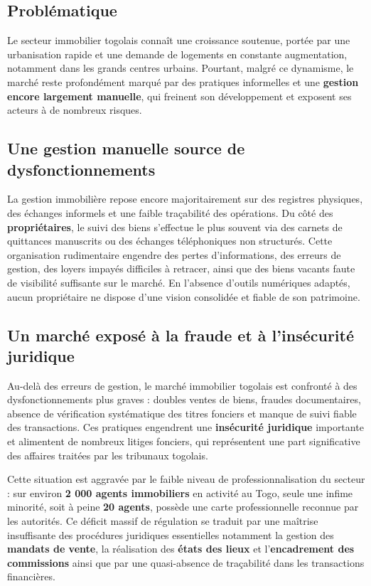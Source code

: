 \documentclass[12pt,a4paper]{report}
\newcommand{\motcle}[1]{\textcolor{marine}{\textbf{#1}}}
\newcommand{\important}[1]{\textcolor{cuivre}{\textbf{#1}}}
\begin{document}
\subsection{Problématique}

\begin{highlightbox}

Le secteur immobilier togolais connaît une croissance soutenue, portée par une urbanisation rapide et une demande de logements en constante augmentation, notamment dans les grands centres urbains. Pourtant, malgré ce dynamisme, le marché reste profondément marqué par des pratiques informelles et une \motcle{gestion encore largement manuelle}, qui freinent son développement et exposent ses acteurs à de nombreux risques.

\subsection{Une gestion manuelle source de dysfonctionnements}

La gestion immobilière repose encore majoritairement sur des registres physiques, des échanges informels et une faible traçabilité des opérations. Du côté des \motcle{propriétaires}, le suivi des biens s'effectue le plus souvent via des carnets de quittances manuscrits ou des échanges téléphoniques non structurés. Cette organisation rudimentaire engendre des pertes d'informations, des erreurs de gestion, des loyers impayés difficiles à retracer, ainsi que des biens vacants faute de visibilité suffisante sur le marché. En l'absence d'outils numériques adaptés, aucun propriétaire ne dispose d'une vision consolidée et fiable de son patrimoine.

\subsection{Un marché exposé à la fraude et à l'insécurité juridique}

Au-delà des erreurs de gestion, le marché immobilier togolais est confronté à des dysfonctionnements plus graves : doubles ventes de biens, fraudes documentaires, absence de vérification systématique des titres fonciers et manque de suivi fiable des transactions. Ces pratiques engendrent une \important{insécurité juridique} importante et alimentent de nombreux litiges fonciers, qui représentent une part significative des affaires traitées par les tribunaux togolais.

Cette situation est aggravée par le faible niveau de professionnalisation du secteur : sur environ \textbf{2 000 agents immobiliers} en activité au Togo, seule une infime minorité, soit à peine \textbf{20 agents}, possède une carte professionnelle reconnue par les autorités. Ce déficit massif de régulation se traduit par une maîtrise insuffisante des procédures juridiques essentielles  notamment la gestion des \textbf{mandats de vente}, la réalisation des \textbf{états des lieux} et l'\textbf{encadrement des commissions}  ainsi que par une quasi-absence de traçabilité dans les transactions financières.


\end{highlightbox}
\end{document}
